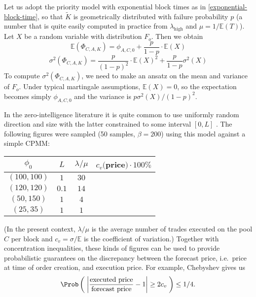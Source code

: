 \documentclass[a4paper,11pt]{article}
\begin{document}
\begin{example}

  Let us adopt the priority model with exponential block times as in \eqref{exponential-block-time}, so that $\widetilde K$ is geometrically distributed with failure probability $p$ (a number that is quite easily computed in practice from $\lambda_\mathrm{high}$ and $\mu = 1/\mathbb{E}(T)$).
  Let $X$ be a random variable with distribution $F_o$.
  Then we obtain
  \begin{equation}
    \mathbb{E}(\Phi_{C,A,K}) = \phi_{A,C,0} + \frac{p}{1-p} \cdot \mathbb{E}(X)
  \end{equation}
  \begin{equation}
    \sigma^2(\Phi_{C,A,K}) = \frac{p}{(1-p)^2} \cdot \mathbb{E}(X)^2 + \frac{p}{1-p}\sigma^2(X)
  \end{equation}
  To compute $\sigma^2(\Phi_{C,A,K}
  )$, we need to make an ansatz on the mean and variance of $F_o$.
  Under typical martingale assumptions, $\mathbb{E}(X)=0$, so the expectation becomes simply $\phi_{A,C,0}$ and the variance is $p\sigma^2(X)/(1-p)^2$.
  
  In the zero-intelligence literature it is quite common to use uniformly random direction and size with the latter constrained to some interval $[0,L]$ \cite[\nopp VII.B.3]{chakraborti2011econophysics}.
  The following figures were sampled (50 samples, $\beta=200$) using this model against a simple CPMM:
  \begin{center}
    \begin{tabular}{ c cc | c }
    $\phi_0$ & $L$ & $\lambda/\mu$ & $c_v($price$)\cdot 100\%$\\
    \hline
    $(100,100)$&  $1$& $30$ &  \\ 
    \hline
    $(120,120)$ & $0.1$ & $14$ &  \\  
    \hline
    $(50,150)$ & $1$ & $4$ &  \\
    \hline
    $(25,35)$ & $1$ & $1$ & 
    \end{tabular}
  \end{center}
  (In the present context, $\lambda/\mu$ is the average number of trades executed on the pool $C$ per block and $c_v=\sigma/\mathbb{E}$ is the coefficient of variation.)
  Together with concentration inequalities, these kinds of figures can be used to provide probabilistic guarantees on the discrepancy between the forecast price, i.e.~price at time of order creation, and execution price. For example, Chebyshev gives us
  \begin{equation}
    \Prob\left(\;\left|\frac{\text{executed price}}{\text{forecast price}}-1\right|\geq 2c_v\;\right) \leq 1/4. 
  \end{equation}
  
\end{example}  
\end{document}
